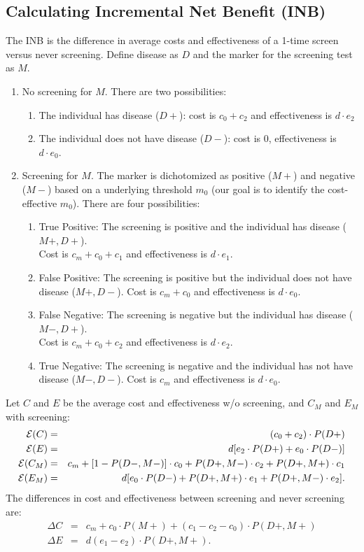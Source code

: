 \documentclass[11pt, letterpaper]{article}
\begin{document}
\subsection{Calculating Incremental Net Benefit (INB)}
\label{sec:INB}

The INB is the difference in average costs and effectiveness of a 1-time screen versus never screening.  Define disease as $D$ and the marker for the screening test as $M$. 
\begin{enumerate}
	\item{No screening for $M$.  There are two possibilities:
		\begin{enumerate}
			\item{The individual has disease ($D+$): cost is $c_0+c_2$ and effectiveness is $d\cdot e_2$}
			\item{The individual does not have disease ($D-$): cost is 0, effectiveness is $d\cdot e_0$.}
		\end{enumerate}
	}
	\item{Screening for $M$.  The marker is dichotomized as positive ($M+$) and negative ($M-$) based on a underlying threshold $m_0$ (our goal is to identify the cost-effective $m_0$).  There are four possibilities:
		\begin{enumerate}
			\item{True Positive: The screening is positive and the individual has disease ($M+,D+$). \\ Cost is $c_m+c_0+c_1$ and effectiveness is $d\cdot e_1$.}
			\item{False Positive: The screening is positive but the individual does not have disease ($M+,D-$).  Cost is $c_m+c_0$ and effectiveness is $d\cdot e_0$.}
			\item{False Negative: The screening is negative but the individual has disease ($M-,D+$).  \\Cost is $c_m+c_0+c_2$ and effectiveness is $d\cdot e_2$.}
			\item{True Negative: The screening is negative and the individual has not have disease ($M-,D-$).  Cost is $c_m$ and effectiveness is $d\cdot e_0$.}
		\end{enumerate}  
	}
\end{enumerate}

\noindent Let $C$ and $E$ be the average cost and effectiveness w/o screening, and $C_M$ and $E_M$ with screening:
\begin{eqnarray*}
	{\cal E} (C) &=& (c_0+c_2)\cdot P(D+) \\
	{\cal E} (E) &=& d[e_2\cdot P(D+) + e_0\cdot P(D-)] \\
	{\cal E} (C_M) &=& c_m + [1-P(D-,M-)]\cdot c_0+P(D+,M-)\cdot c_2+P(D+,M+)\cdot c_1\\
	{\cal E} (E_M) &=& d[e_0\cdot P(D-) + P(D+,M+)\cdot e_1 + P(D+,M-)\cdot e_2].
\end{eqnarray*}
The differences in cost and effectiveness between screening and never screening are:
\begin{eqnarray*}
	\Delta C &=& c_m + c_0\cdot P(M+) + (c_1 - c_2 - c_0)\cdot P(D+,M+)\\
	\Delta E &=& d(e_1 - e_2)\cdot P(D+,M+).
\end{eqnarray*}
\end{document}
